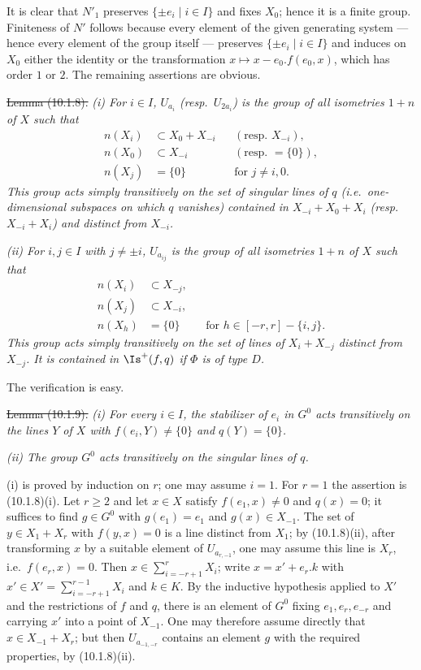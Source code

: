 \documentclass[12pt,a4paper,oneside,english]{smfart}
\theoremstyle{definition}
\theoremstyle{bt}
\begin{document}
\pf It is clear that $N'_1$ preserves $\{\pm e_i\mid i\in I\}$ and fixes $X_0$;
hence it is a finite group. Finiteness of $N'$ follows because every element of
the given generating system --- hence every element of the group itself ---
preserves $\{\pm e_i\mid i\in I\}$ and induces on $X_0$ either the identity or
the transformation $x\mapsto x-e_0.f(e_0,x)$, which has order $1$ or $2$. The
remaining assertions are obvious.

\st{Lemma (10.1.8).}
\emph{(i) For $i\in I$, $U_{a_i}$ (resp.\ $U_{2a_i}$) is the group of all
isometries $1+n$ of $X$ such that}
\begin{align*}
n(X_i)&\subset X_0+X_{-i} &&(\text{resp.\ } X_{-i}),\\
n(X_0)&\subset X_{-i}     &&(\text{resp.\ } =\{0\}),\\
n(X_j)&=\{0\} &&\text{for } j\neq i,0.
\end{align*}
\emph{This group acts simply transitively on the set of singular lines of $q$
(i.e.\ one-dimensional subspaces on which $q$ vanishes) contained in
$X_{-i}+X_0+X_i$ (resp.\ $X_{-i}+X_i$) and distinct from $X_{-i}$.}

\emph{(ii) For $i,j\in I$ with $j\neq\pm i$, $U_{a_{ij}}$ is the group of all
isometries $1+n$ of $X$ such that}
\begin{align*}
n(X_i)&\subset X_{-j},\\
n(X_j)&\subset X_{-i},\\
n(X_h)&=\{0\} &&\text{for } h\in[-r,r]-\{i,j\}.
\end{align*}
\emph{This group acts simply transitively on the set of lines of $X_i+X_{-j}$
distinct from $X_{-j}$. It is contained in $\Is^{+}(f,q)$ if $\Phi$ is of type
$D$.}

\smallskip
The verification is easy.

\st{Lemma (10.1.9).}
\emph{(i) For every $i\in I$, the stabilizer of $e_i$ in $G^{0}$ acts
transitively on the lines $Y$ of $X$ with $f(e_i,Y)\neq\{0\}$ and $q(Y)=\{0\}$.}

\emph{(ii) The group $G^{0}$ acts transitively on the singular lines of $q$.}

\pf (i) is proved by induction on $r$; one may assume $i=1$. For $r=1$ the
assertion is (10.1.8)(i). Let $r\ge2$ and let $x\in X$ satisfy $f(e_1,x)\neq0$
and $q(x)=0$; it suffices to find $g\in G^{0}$ with $g(e_1)=e_1$ and
$g(x)\in X_{-1}$. The set of $y\in X_1+X_r$ with $f(y,x)=0$ is a line distinct
from $X_1$; by (10.1.8)(ii), after transforming $x$ by a suitable element of
$U_{a_{r,-1}}$, one may assume this line is $X_r$, i.e.\ $f(e_r,x)=0$. Then
$x\in\sum_{i=-r+1}^{r}X_i$; write $x=x'+e_r.k$ with
$x'\in X'=\sum_{i=-r+1}^{r-1}X_i$ and $k\in K$. By the inductive hypothesis
applied to $X'$ and the restrictions of $f$ and $q$, there is an element of
$G^{0}$ fixing $e_1,e_r,e_{-r}$ and carrying $x'$ into a point of $X_{-1}$. One
may therefore assume directly that $x\in X_{-1}+X_r$; but then $U_{a_{-1,-r}}$
contains an element $g$ with the required properties, by (10.1.8)(ii).
\end{document}
